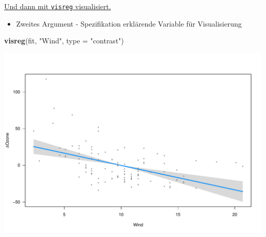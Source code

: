 \documentclass[ignorenonframetext,]{beamer}
\newenvironment{Shaded}{}{}
\newcommand{\KeywordTok}[1]{\textcolor[rgb]{0.00,0.44,0.13}{\textbf{{#1}}}}
\newcommand{\DataTypeTok}[1]{\textcolor[rgb]{0.56,0.13,0.00}{{#1}}}
\newcommand{\StringTok}[1]{\textcolor[rgb]{0.25,0.44,0.63}{{#1}}}
\newcommand{\NormalTok}[1]{{#1}}
\providecommand{\tightlist}{%
\setlength{\itemsep}{0pt}\setlength{\parskip}{0pt}}
\begin{document}
\begin{frame}[fragile]{\href{http://myweb.uiowa.edu/pbreheny/publications/visreg.pdf}{Und
dann mit \texttt{visreg} visualisiert.}}

\begin{itemize}
\tightlist
\item
  Zweites Argument - Spezifikation erklärende Variable für
  Visualisierung
\end{itemize}

\begin{Shaded}
\begin{Highlighting}[]
\KeywordTok{visreg}\NormalTok{(fit, }\StringTok{"Wind"}\NormalTok{, }\DataTypeTok{type =} \StringTok{"contrast"}\NormalTok{)}
\end{Highlighting}
\end{Shaded}

\includegraphics{R_intern_files/figure-beamer/unnamed-chunk-310-1.pdf}

\end{frame}
\end{document}
